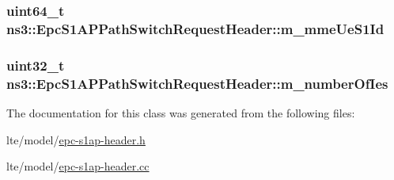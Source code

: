 \subsubsection[{\texorpdfstring{m\+\_\+mme\+Ue\+S1\+Id}{m_mmeUeS1Id}}]{\setlength{\rightskip}{0pt plus 5cm}uint64\+\_\+t ns3\+::\+Epc\+S1\+A\+P\+Path\+Switch\+Request\+Header\+::m\+\_\+mme\+Ue\+S1\+Id\hspace{0.3cm}{\ttfamily [private]}}\hypertarget{classns3_1_1EpcS1APPathSwitchRequestHeader_a1ba924af488ee3ae3afaf42632681048}{}\label{classns3_1_1EpcS1APPathSwitchRequestHeader_a1ba924af488ee3ae3afaf42632681048}
\subsubsection[{\texorpdfstring{m\+\_\+number\+Of\+Ies}{m_numberOfIes}}]{\setlength{\rightskip}{0pt plus 5cm}uint32\+\_\+t ns3\+::\+Epc\+S1\+A\+P\+Path\+Switch\+Request\+Header\+::m\+\_\+number\+Of\+Ies\hspace{0.3cm}{\ttfamily [private]}}\hypertarget{classns3_1_1EpcS1APPathSwitchRequestHeader_a7b8feb624d5290c0dbb7525283514d60}{}\label{classns3_1_1EpcS1APPathSwitchRequestHeader_a7b8feb624d5290c0dbb7525283514d60}


The documentation for this class was generated from the following files\+:\begin{DoxyCompactItemize}
\item 
lte/model/\hyperlink{epc-s1ap-header_8h}{epc-\/s1ap-\/header.\+h}\item 
lte/model/\hyperlink{epc-s1ap-header_8cc}{epc-\/s1ap-\/header.\+cc}\end{DoxyCompactItemize}
